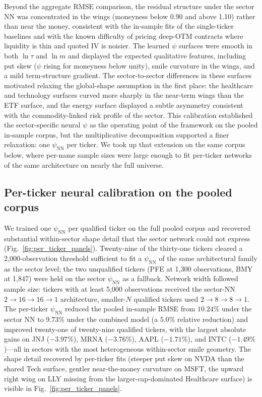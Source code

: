 Beyond the aggregate RMSE comparison, the residual structure under the sector NN was concentrated in the wings (moneyness below 0.90 and above 1.10) rather than near the money, consistent with the in-sample fits of the single-ticker baselines and with the known difficulty of pricing deep-OTM contracts where liquidity is thin and quoted IV is noisier. The learned $\psi$ surfaces were smooth in both $\ln\tau$ and $\ln m$ and displayed the expected qualitative features, including put skew ($\psi$ rising for moneyness below unity), smile curvature in the wings, and a mild term-structure gradient. The sector-to-sector differences in these surfaces motivated relaxing the global-shape assumption in the first place: the healthcare and technology surfaces curved more sharply in the near-term wings than the ETF surface, and the energy surface displayed a subtle asymmetry consistent with the commodity-linked risk profile of the sector. This calibration established the sector-specific neural $\psi$ as the operating point of the framework on the pooled in-sample corpus, but the multiplicative decomposition supported a finer relaxation: one $\psi_{\text{NN}}$ per ticker. We took up that extension on the same corpus below, where per-name sample sizes were large enough to fit per-ticker networks of the same architecture on nearly the full universe.

\subsection{Per-ticker neural calibration on the pooled corpus}\label{sec:per_ticker_nn}

We trained one $\psi_{\text{NN}}$ per qualified ticker on the full pooled corpus and recovered substantial within-sector shape detail that the sector network could not express (Fig.~\ref{fig:per_ticker_panels}). Twenty-nine of the thirty-one tickers cleared a 2{,}000-observation threshold sufficient to fit a $\psi_{\text{NN}}$ of the same architectural family as the sector level; the two unqualified tickers (PFE at 1{,}300 observations, BMY at 1{,}847) were held on the sector $\psi_{\text{NN}}$ as a fallback. Network width followed sample size: tickers with at least 5{,}000 observations received the sector-NN $2 \to 16 \to 16 \to 1$ architecture, smaller-$N$ qualified tickers used $2 \to 8 \to 8 \to 1$. The per-ticker $\psi_{\text{NN}}$ reduced the pooled in-sample RMSE from $10.24\%$ under the sector NN to $9.73\%$ under the combined model (a $5.0\%$ relative reduction) and improved twenty-one of twenty-nine qualified tickers, with the largest absolute gains on JNJ ($-3.97\%$), MRNA ($-3.76\%$), AAPL ($-1.71\%$), and INTC ($-1.49\%$)---all in sectors with the most heterogeneous within-sector smile geometry. The shape detail recovered by per-ticker fits (steeper put skew on NVDA than the shared Tech surface, gentler near-the-money curvature on MSFT, the upward right wing on LLY missing from the larger-cap-dominated Healthcare surface) is visible in Fig.~\ref{fig:per_ticker_panels}.

